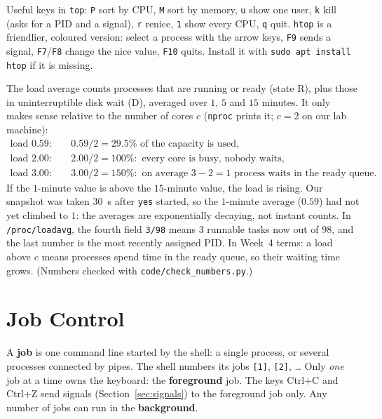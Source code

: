 \documentclass[11pt,a4paper]{article}
\newcommand{\term}[1]{\textbf{\color{mintdeep}#1}}
\newcommand{\cmd}[1]{\texttt{#1}}
\begin{document}
Useful keys in \cmd{top}: \texttt{P} sort by CPU, \texttt{M} sort by memory, \texttt{u} show one user, \texttt{k} kill (asks for a PID and a signal), \texttt{r} renice, \texttt{1} show every CPU, \texttt{q} quit. \cmd{htop} is a friendlier, coloured version: select a process with the arrow keys, \texttt{F9} sends a signal, \texttt{F7}/\texttt{F8} change the nice value, \texttt{F10} quits. Install it with \cmd{sudo apt install htop} if it is missing.

\begin{example}
The load average counts processes that are running or ready (state R), plus those in uninterruptible disk wait (D), averaged over $1$, $5$ and $15$ minutes. It only makes sense relative to the number of cores $c$ (\cmd{nproc} prints it; $c = 2$ on our lab machine):
\begin{align*}
\text{load } 0.59: &\quad 0.59 / 2 = 29.5\% \text{ of the capacity is used,}\\
\text{load } 2.00: &\quad 2.00 / 2 = 100\%: \text{ every core is busy, nobody waits,}\\
\text{load } 3.00: &\quad 3.00 / 2 = 150\%: \text{ on average } 3 - 2 = 1 \text{ process waits in the ready queue.}
\end{align*}
If the $1$-minute value is above the $15$-minute value, the load is rising. Our snapshot was taken $30$~s after \cmd{yes} started, so the $1$-minute average ($0.59$) had not yet climbed to $1$: the averages are exponentially decaying, not instant counts. In \texttt{/proc/loadavg}, the fourth field \texttt{3/98} means $3$ runnable tasks now out of $98$, and the last number is the most recently assigned PID. In Week~4 terms: a load above $c$ means processes spend time in the ready queue, so their waiting time grows. (Numbers checked with \texttt{code/check\_numbers.py}.)
\end{example}

\section{Job Control}
\label{sec:jobs}

A \term{job} is one command line started by the shell: a single process, or several processes connected by pipes. The shell numbers its jobs \texttt{[1]}, \texttt{[2]}, \dots{} Only \emph{one} job at a time owns the keyboard: the \term{foreground} job. The keys Ctrl+C and Ctrl+Z send signals (Section~\ref{sec:signals}) to the foreground job only. Any number of jobs can run in the \term{background}.
\end{document}
